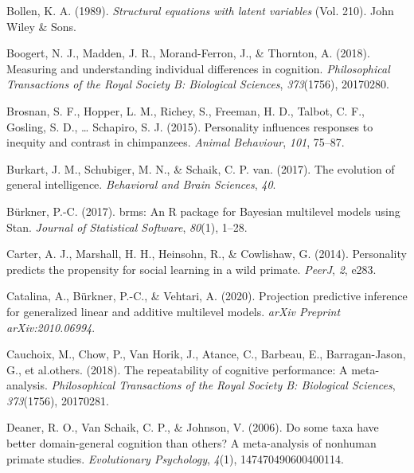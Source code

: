 \documentclass[
  man,floatsintext]{apa6}
\newlength{\cslhangindent}
\newlength{\cslentryspacingunit} %
\newenvironment{CSLReferences}[2] %
 {%
  \setlength{\parindent}{0pt}
  \ifodd #1
  \let\oldpar\par
  \def\par{\hangindent=\cslhangindent\oldpar}
  \fi
  \setlength{\parskip}{#2\cslentryspacingunit}
 }%
 {}
\begin{document}
\begin{CSLReferences}{1}{0}
\leavevmode{}%
Bollen, K. A. (1989). \emph{Structural equations with latent variables} (Vol. 210). John Wiley \& Sons.

\leavevmode{}%
Boogert, N. J., Madden, J. R., Morand-Ferron, J., \& Thornton, A. (2018). Measuring and understanding individual differences in cognition. \emph{Philosophical Transactions of the Royal Society B: Biological Sciences}, \emph{373}(1756), 20170280.

\leavevmode{}%
Brosnan, S. F., Hopper, L. M., Richey, S., Freeman, H. D., Talbot, C. F., Gosling, S. D., \ldots{} Schapiro, S. J. (2015). Personality influences responses to inequity and contrast in chimpanzees. \emph{Animal Behaviour}, \emph{101}, 75--87.

\leavevmode{}%
Burkart, J. M., Schubiger, M. N., \& Schaik, C. P. van. (2017). The evolution of general intelligence. \emph{Behavioral and Brain Sciences}, \emph{40}.

\leavevmode{}%
Bürkner, P.-C. (2017). {brms}: An {R} package for {Bayesian} multilevel models using {Stan}. \emph{Journal of Statistical Software}, \emph{80}(1), 1--28.

\leavevmode{}%
Carter, A. J., Marshall, H. H., Heinsohn, R., \& Cowlishaw, G. (2014). Personality predicts the propensity for social learning in a wild primate. \emph{PeerJ}, \emph{2}, e283.

\leavevmode{}%
Catalina, A., Bürkner, P.-C., \& Vehtari, A. (2020). Projection predictive inference for generalized linear and additive multilevel models. \emph{arXiv Preprint arXiv:2010.06994}.

\leavevmode{}%
Cauchoix, M., Chow, P., Van Horik, J., Atance, C., Barbeau, E., Barragan-Jason, G., et al.others. (2018). The repeatability of cognitive performance: A meta-analysis. \emph{Philosophical Transactions of the Royal Society B: Biological Sciences}, \emph{373}(1756), 20170281.

\leavevmode{}%
Deaner, R. O., Van Schaik, C. P., \& Johnson, V. (2006). Do some taxa have better domain-general cognition than others? A meta-analysis of nonhuman primate studies. \emph{Evolutionary Psychology}, \emph{4}(1), 147470490600400114.


\end{CSLReferences}
\end{document}
